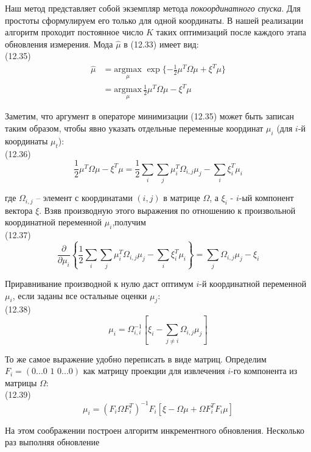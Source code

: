 \documentclass[10pt,a4paper]{article}
\begin{document}
Наш метод представляет собой экземпляр метода \textit{покоординатного спуска}. Для простоты сформулируем его только для одной координаты. В нашей реализации алгоритм проходит постоянное число $K$ таких оптимизаций после каждого этапа обновления измерения. Мода $\hat{\mu}$ в (12.33) имеет вид:\\

(12.35)
\begin{equation*}
\begin{split}
\hat{\mu}&=\underset{\mu}{\text{argmax}}\,\,\exp\{-\frac{1}{2}\mu^T\varOmega\mu+\xi^T\mu\}\\
&=\underset{\mu}{\text{argmax}}\,\frac{1}{2}\mu^T\varOmega\mu-\xi^T\mu
\end{split}
\end{equation*}

Заметим, что аргумент в операторе минимизации (12.35) может быть записан таким образом, чтобы явно указать отдельные переменные координат $\mu_i$ (для $i$-й координаты $\mu_t$):\\

(12.36)
$$\frac{1}{2}\mu^T\varOmega\mu-\xi^T\mu=\frac{1}{2}\sum_i\sum_j\mu_i^T\varOmega_{i,j}\mu_j-\sum_i\xi_i^T\mu_i$$

где $\varOmega_{i,j}$ – элемент с координатами $(i, j)$ в матрице $\varOmega$, а $\xi_i$ -
$i$-ый компонент вектора $\xi$. Взяв производную этого выражения по отношению к произвольной координатной переменной $\mu_i$,получим\\

(12.37)
$$\frac{\partial}{\partial\mu_i}\left\lbrace \frac{1}{2}\sum_i\sum_j\mu_i^T\varOmega_{i,j}\mu_j-\sum_i\xi_i^T\mu_i\right\rbrace =\sum_j\varOmega_{i,j}\mu_j-\xi_i$$

Приравнивание производной к нулю даст оптимум $i$-й координатной переменной $\mu_i$, если заданы все остальные оценки $\mu_j$:\\

(12.38)
$$\mu_i=\varOmega_{i,i}^{-1}\left[ \xi_i-\sum_{j\neq i}\varOmega_{i,j}\mu_j\right] $$

То же самое выражение удобно переписать в виде матриц. Определим $F_i=(0...0\,\,1\,\,0...0)$ как матрицу проекции для извлечения $i$-го компонента из матрицы $\varOmega$:\\

(12.39)
$$\mu_i=(F_i\varOmega F_i^T)^{-1}F_i[\xi-\varOmega\mu+\varOmega F_i^TF_i\mu]$$

На этом соображении построен алгоритм инкрементного обновления. 
Несколько раз выполняя обновление\\
\end{document}
